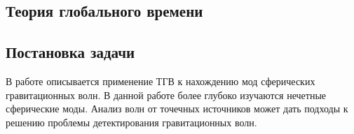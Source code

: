 \documentclass[\docroot/reports/draft/report.tex]{subfiles}
\begin{document}
\onlyinsubfile{\tableofcontents}

\subsection{Теория глобального времени\label{sec:tgt}}

    

    

\subsection{Постановка задачи}

    В работе \cite{burlankov_grav_waves} описывается применение ТГВ к нахождению мод сферических гравитационных волн. В данной работе более глубоко изучаются нечетные сферические моды. Анализ волн от точечных источников может дать подходы к решению проблемы детектирования гравитационных волн.

\end{document}
